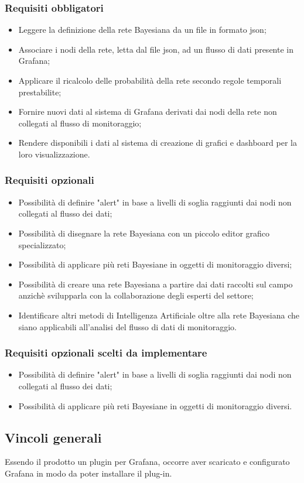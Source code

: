 			\subsubsection{Requisiti obbligatori}
				\begin{itemize}
					\item Leggere la definizione della rete Bayesiana da un file in formato json;
					\item Associare i nodi della rete, letta dal file json, ad un flusso di dati presente in Grafana;
					\item Applicare il ricalcolo delle probabilità della rete secondo regole temporali prestabilite;
					\item Fornire nuovi dati al sistema di Grafana derivati dai nodi della rete non collegati al flusso di monitoraggio;
					\item Rendere disponibili i dati al sistema di creazione di grafici e dashboard per la loro visualizzazione.
		        	\end{itemize}
			\subsubsection{Requisiti opzionali}
				\begin{itemize}
					\item Possibilità di definire "alert\pedice" in base a livelli di soglia raggiunti dai nodi non collegati al flusso dei dati;
					\item Possibilità di disegnare la rete Bayesiana con un piccolo editor grafico specializzato;
					\item Possibilità di applicare più reti Bayesiane in oggetti di monitoraggio diversi;
					\item Possibilità di creare una rete Bayesiana a partire dai dati raccolti sul campo anzichè svilupparla con la collaborazione degli esperti del settore;
					\item Identificare altri metodi di Intelligenza Artificiale oltre alla rete Bayesiana che siano applicabili all'analisi del flusso di dati di monitoraggio.
		        	\end{itemize}
		        \subsubsection{Requisiti opzionali scelti da implementare}
				\begin{itemize}
					\item Possibilità di definire "alert" in base a livelli di soglia raggiunti dai nodi non collegati al flusso dei dati;
					\item Possibilità di applicare più reti Bayesiane in oggetti di monitoraggio diversi.
	        		\end{itemize}
				
				
			\subsection{Vincoli generali}			
Essendo il prodotto un plugin per Grafana, occorre aver scaricato e configurato Grafana in modo da poter installare il plug-in.


\newpage
